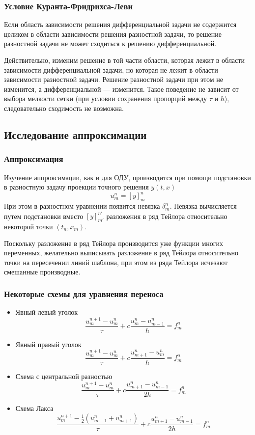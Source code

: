 \documentclass[professionalfonts,compress,unicode,aspectratio=169]{beamer}
\begin{document}
\begin{frame}\frametitle{Условие Куранта-Фридрихса-Леви}
	Если область зависимости решения дифференциальной задачи не содержится целиком в области 
	зависимости решения разностной задачи, то решение разностной задачи не может
	сходиться к решению	дифференциальной.

	Действительно, изменим решение в той части области, которая лежит в области зависимости дифференциальной задачи,
	но которая не лежит в области зависимости разностной задачи. Решение разностной задачи при этом не изменится,
	а дифференциальной --- изменится. Такое поведение не зависит от выбора мелкости сетки (при условии сохранения пропорций между $\tau$ и $h$),
	следовательно сходимость не возможна.
\end{frame}

\subsection{Исследование аппроксимации}
\begin{frame}\frametitle{Аппроксимация}
	Изучение аппроксимации, как и для ОДУ, производится при помощи подстановки в разностную
	задачу проекции точного решения $y(t,x)$
	\[u^n_m = [y]^n_m\]
	При этом в разностном уравнении появится невязка $\delta^n_m$. Невязка вычисляется путем подстановки
	вместо $[y]^{n'}_{m'}$ разложения в ряд Тейлора относительно некоторой точки $(t_n,x_m)$.

	Поскольку разложение в ряд Тейлора производится уже функции многих переменных, желательно 
	выписывать разложение в ряд Тейлора относительно точки на пересечении линий шаблона, 
	при этом из ряда Тейлора исчезают смешанные производные.
\end{frame}

\begin{frame}\frametitle{Некоторые схемы для уравнения переноса}
	\begin{itemize}
		\item Явный левый уголок
		\[
		\frac{u^{n+1}_m-u^n_m}{\tau} + c \frac{u^{n}_m-u^n_{m-1}}{h} = f_m^n
		\]
		\item Явный правый уголок
		\[
		\frac{u^{n+1}_m-u^n_m}{\tau} + c \frac{u^{n}_{m+1}-u^n_m}{h} = f_m^n
		\]
		\item Схема с центральной разностью
		\[
		\frac{u^{n+1}_m-u^n_m}{\tau} + c \frac{u^{n}_{m+1}-u^n_{m-1}}{2h} = f_m^n
		\]
		\item Схема Лакса
		\[
		\frac{u^{n+1}_m-\frac{1}{2}\left(u^n_{m-1}+u^n_{m+1}\right)}{\tau} + c \frac{u^{n}_{m+1}-u^n_{m-1}}{2h} = f_m^n
		\]
	\end{itemize}
\end{frame}
\end{document}
